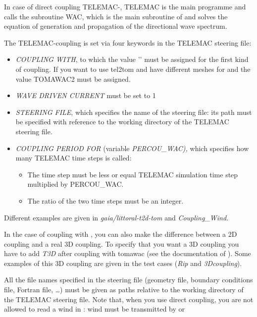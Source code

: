 In case of direct coupling TELEMAC-\tomawac, TELEMAC is the main programme and calls the \tomawac subroutine WAC, which is the main
subroutine of \tomawac and solves the equation of generation and propagation of the directional wave spectrum.

The TELEMAC-\tomawac coupling is set via four keywords in the TELEMAC steering file:

\begin{itemize}
\item  \textit{COUPLING WITH}, to which the value '\tomawac' must be assigned for the first kind of coupling. If you want to use
  tel2tom and have different meshes for \tomawac and \telemac{} the value TOMAWAC2 must be assigned. 
\item  \textit{WAVE DRIVEN CURRENT} must be set to 1

\item  \textit{\tomawac STEERING FILE}, which specifies the name of the \tomawac steering file: its path must be specified with
  reference to the working directory of the TELEMAC steering file.

\item  \textit{COUPLING PERIOD FOR \tomawac} (variable \textit{PERCOU\_WAC),} which specifies how many TELEMAC time steps \tomawac
  is called:

\begin{itemize}
\item  The \tomawac time step must be less or equal TELEMAC simulation time step multiplied by PERCOU\_WAC.

\item  The ratio of the two time steps must be an integer.
\end{itemize}
\end{itemize}

Different examples are given in {\it gaia/littoral-t2d-tom} and {\it Coupling\_Wind}.

In the case of coupling with , you can also make the difference between a 2D coupling and a real 3D coupling.
To specify that you want a 3D coupling you have to add {\it T3D} after coupling with tomawac (see the documentation of ).
Some examples of this 3D coupling are given in the test cases ({\it Rip} and {\it 3Dcoupling}).

All the file names specified in the \tomawac steering file (geometry file, boundary conditions file, Fortran file, 
\dots ) must be given as paths relative to the working directory of the TELEMAC steering file. Note that, when you
use direct coupling, you are not allowed to read a wind in \tomawac: wind must be transmitted by  or 

